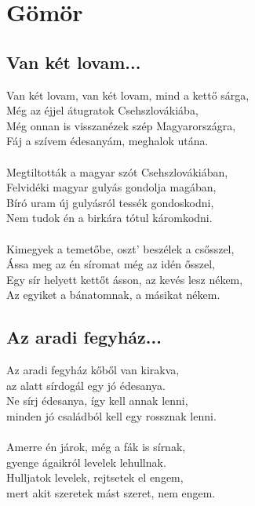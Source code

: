 \chapter{Gömör}
	\section{Van két lovam...}
	Van két lovam, van két lovam, mind a kettő sárga,\\
	Még az éjjel átugratok Csehszlovákiába,\\
	Még onnan is visszanézek szép Magyarországra,\\
	Fáj a szívem édesanyám, meghalok utána.\\\\
	Megtiltották a magyar szót Csehszlovákiában,\\
	Felvidéki magyar gulyás gondolja magában,\\
	Bíró uram új gulyásról tessék gondoskodni,\\
	Nem tudok én a birkára tótul káromkodni.\\\\
	Kimegyek a temetőbe, oszt’ beszélek a csősszel,\\
	Ássa meg az én síromat még az idén ősszel,\\
	Egy sír helyett kettőt ásson, az kevés lesz nékem,\\
	Az egyiket a bánatomnak, a másikat nékem.\\
	\section{Az aradi fegyház...}
	Az aradi fegyház kőből van kirakva,\\
	az alatt sírdogál egy jó édesanya.\\
	Ne sírj édesanya, így kell annak lenni,\\
	minden jó családból kell egy rossznak lenni.\\\\
	Amerre én járok, még a fák is sírnak,\\
	gyenge ágaikról levelek lehullnak.\\
	Hulljatok levelek, rejtsetek el engem,\\
	mert akit szeretek mást szeret, nem engem.\\
